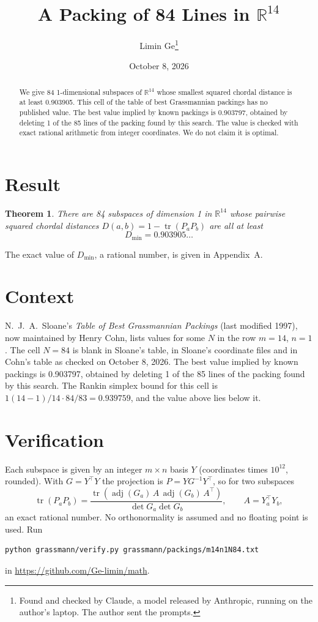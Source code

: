 \documentclass[11pt,a4paper]{article}
\title{A Packing of 84 Lines in $\mathbb{R}^{14}$}
\author{Limin Ge\thanks{Found and checked by Claude, a model released by Anthropic, running on the author's laptop. The author sent the prompts.}}
\date{October 8, 2026}
\newtheorem*{theorem}{Theorem}
\begin{document}
\maketitle
\begin{abstract}
We give 84 1-dimensional subspaces of $\mathbb{R}^{14}$ whose smallest squared chordal distance is at least 0.903905. This cell of the table of best Grassmannian packings has no published value. The best value implied by known packings is 0.903797, obtained by deleting 1 of the 85 lines of the packing found by this search. The value is checked with exact rational arithmetic from integer coordinates. We do not claim it is optimal.
\end{abstract}

\section{Result}
\begin{theorem}
There are 84 subspaces of dimension 1 in $\mathbb{R}^{14}$ whose pairwise squared chordal distances $D(a,b) = 1 - \operatorname{tr}(P_aP_b)$ are all at least
\[ D_{\min} = 0.903905\ldots \]
\end{theorem}
The exact value of $D_{\min}$, a rational number, is given in Appendix~A.


\section{Context}
N.~J.~A.~Sloane's \emph{Table of Best Grassmannian Packings} (last modified 1997), now maintained by Henry Cohn, lists values for some $N$ in the row $m=14$, $n=1$. The cell $N=84$ is blank in Sloane's table, in Sloane's coordinate files and in Cohn's table as checked on October 8, 2026. The best value implied by known packings is 0.903797, obtained by deleting 1 of the 85 lines of the packing found by this search. The Rankin simplex bound for this cell is $1(14-1)/14\cdot 84/83 = 0.939759$, and the value above lies below it.


\section{Verification}
Each subspace is given by an integer $m\times n$ basis $Y$ (coordinates times $10^{12}$, rounded). With $G=Y^\top Y$ the projection is $P=YG^{-1}Y^\top$, so for two subspaces
\[ \operatorname{tr}(P_aP_b)=\frac{\operatorname{tr}(\operatorname{adj}(G_a)\,A\,\operatorname{adj}(G_b)\,A^\top)}{\det G_a\det G_b},\qquad A=Y_a^\top Y_b, \]
an exact rational number. No orthonormality is assumed and no floating point is used. Run
\begin{verbatim}
python grassmann/verify.py grassmann/packings/m14n1N84.txt
\end{verbatim}
in \url{https://github.com/Ge-limin/math}.
\end{document}
